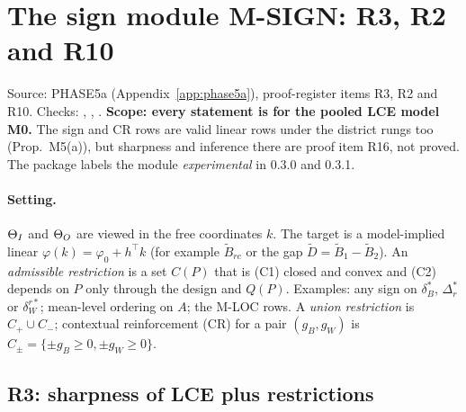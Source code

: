 \section{The sign module M-SIGN: R3, R2 and R10}\label{sec:msign}

Source: PHASE5a (Appendix~\ref{app:phase5a}), proof-register items R3, R2 and
R10. Checks: , ,
. \textbf{Scope: every statement is for the pooled LCE
model M0.} The sign and CR rows are valid linear rows under the district rungs
too (Prop.~M5(a)), but sharpness and inference there are proof item R16, not
proved. The package labels the module \emph{experimental} in 0.3.0 and 0.3.1.

\paragraph{Setting.} $\Theta_I$ and $\Theta_O$ are viewed in the free coordinates $k$.
The target is a model-implied linear $\varphi(k)=\varphi_0+h^\top k$ (for example
$\tilde B_{rc}$ or the gap $\tilde D=\tilde B_1-\tilde B_2$). An \emph{admissible
restriction} is a set $C(P)$ that is (C1) closed and convex and (C2) depends on
$P$ only through the design and $Q(P)$. Examples: any sign on $\delta^*_B$,
$\Delta^*_r$ or $\delta^{r*}_W$; mean-level ordering on $A$; the M-LOC rows. A
\emph{union restriction} is $C_+\cup C_-$; contextual reinforcement (CR) for a pair
$(g_B,g_W)$ is $C_\pm=\{\pm g_B\ge0,\pm g_W\ge0\}$.

\subsection{R3: sharpness of LCE plus restrictions}

